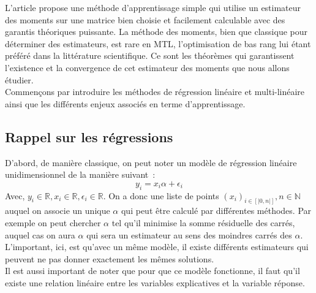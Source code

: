 \documentclass[12pt]{article}
\begin{document}
L'article \cite{MTLR_1} propose une méthode d'apprentissage simple qui utilise un estimateur des moments sur une matrice bien choisie et facilement calculable avec des garantis théoriques puissante. La méthode des moments, bien que classique pour déterminer des estimateurs, est rare en MTL, l'optimisation de bas rang lui étant préféré dans la littérature scientifique. Ce sont les théorèmes qui garantissent l'existence et la convergence de cet estimateur des moments que nous allons étudier.\\

\noindent Commençons par introduire les méthodes de régression linéaire et multi-linéaire ainsi que les différents enjeux associés en terme d'apprentissage.

\subsection{Rappel sur les régressions}

\noindent D'abord, de manière classique, on peut noter un modèle de régression linéaire unidimensionnel de la manière suivant~:
$$
y_i = x_i\alpha + \epsilon_i
$$
Avec, $y_i \in \mathbb{R}, x_i \in \mathbb{R}, \epsilon_i \in \mathbb{R}$. On a donc une liste de points $(x_i)_{i \in \left[|0, n| \right]}, n \in \mathbb{N}$ auquel on associe un unique $\alpha$ qui peut être calculé par différentes méthodes. Par exemple on peut chercher $\alpha$ tel qu'il minimise la somme résiduelle des carrés, auquel cas on aura $\hat{\alpha}$ qui sera un estimateur au sens des moindres carrés des $\alpha$. L'important, ici, est qu'avec un même modèle, il existe différents estimateurs qui peuvent ne pas donner exactement les mêmes solutions.\\
Il est aussi important de noter que pour que ce modèle fonctionne, il faut qu'il existe une relation linéaire entre les variables explicatives et la variable réponse.\\
\end{document}
